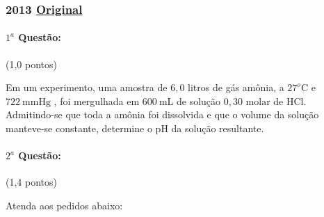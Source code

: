 \documentclass[12pt,a4paper]{article}
\newcommand{\original}[1]{\tiny \href{#1}{Original} \normalsize}
\begin{document}
\newpage

\subsubsection{2013 \original{https://drive.google.com/file/d/1VC0vfRAONUSdPEqis5oB4u4HUN5vIE63/view?usp=sharing}}

\paragraph{$1^a$ Questão:} (1,0 pontos)

Em um experimento, uma amostra de $6,0$ litros de gás amônia, a $27^o\textrm{C}$ e $722 \ \textrm{mmHg}$ , foi mergulhada em $600 \ \textrm{mL}$ de solução $0,30 \textrm{ molar}$  de $\textrm{HCl}$. Admitindo-se que toda a amônia foi dissolvida e que o volume da solução manteve-se constante, determine o $\textrm{pH}$ da solução resultante. 


\paragraph{$2^a$ Questão:} (1,4 pontos)

Atenda aos pedidos abaixo:
\end{document}
